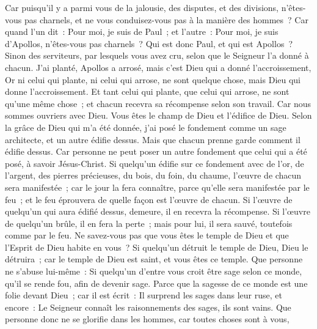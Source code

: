 \begin{multicols}{2}
Car puisqu'il y a parmi vous de la jalousie, des disputes, et des divisions, n'êtes-vous pas charnels, et ne vous conduisez-vous pas à la manière des hommes~?
Car quand l'un dit~: Pour moi, je suis de Paul~; et l'autre~: Pour moi, je suis d'Apollos, n'êtes-vous pas charnels~?
Qui est donc Paul, et qui est Apollos~? Sinon des serviteurs, par lesquels vous avez cru, selon que le Seigneur l'a donné à chacun.
J'ai planté, Apollos a arrosé, mais c'est Dieu qui a donné l'accroissement,
Or ni celui qui plante, ni celui qui arrose, ne sont quelque chose, mais Dieu qui donne l'accroissement.
Et tant celui qui plante, que celui qui arrose, ne sont qu'une même chose~; et chacun recevra sa récompense selon son travail.
Car nous sommes ouvriers avec Dieu. Vous êtes le champ de Dieu et l'édifice de Dieu.
Selon la grâce de Dieu qui m'a été donnée, j'ai posé le fondement comme un sage architecte, et un autre édifie dessus. Mais que chacun prenne garde comment il édifie dessus.
Car personne ne peut poser un autre fondement que celui qui a été posé, à savoir Jésus-Christ.
Si quelqu'un édifie sur ce fondement avec de l'or, de l'argent, des pierres précieuses, du bois, du foin, du chaume, l'œuvre de chacun sera manifestée~;
car le jour la fera connaître, parce qu'elle sera manifestée par le feu~; et le feu éprouvera de quelle façon est l'œuvre de chacun.
Si l'œuvre de quelqu'un qui aura édifié dessus, demeure, il en recevra la récompense.
Si l'œuvre de quelqu'un brûle, il en fera la perte~; mais pour lui, il sera sauvé, toutefois comme par le feu. 
Ne savez-vous pas que vous êtes le temple de Dieu et que l'Esprit de Dieu habite en vous~?
Si quelqu'un détruit le temple de Dieu, Dieu le détruira~; car le temple de Dieu est saint, et vous êtes ce temple.
Que personne ne s'abuse lui-même~: Si quelqu'un d'entre vous croit être sage selon ce monde, qu'il se rende fou, afin de devenir sage.
Parce que la sagesse de ce monde est une folie devant Dieu~; car il est écrit~: Il surprend les sages dans leur ruse,
et encore~: Le Seigneur connaît les raisonnements des sages, ils sont vains.
Que personne donc ne se glorifie dans les hommes, car toutes choses sont à vous,

\end{multicols}
